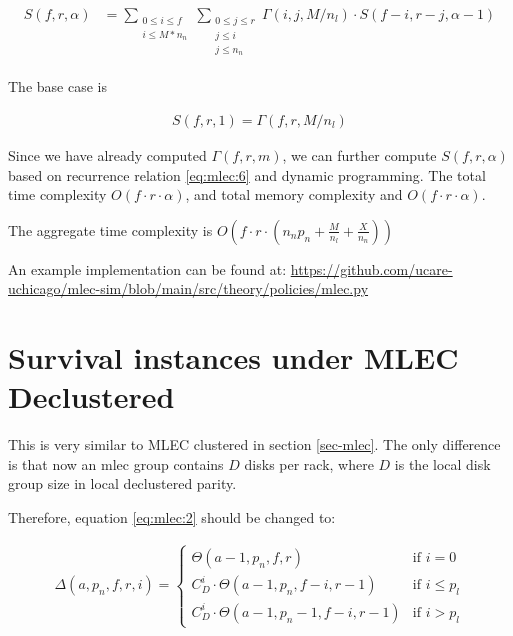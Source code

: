 \documentclass{article}
\begin{document}
\begin{eqnarray}
\begin{aligned}
  S(f,r,\alpha)
  &= \sum_{\substack{0 \leq i \leq f \\ i \leq M*n_n}}
  \sum_{\substack{0 \leq j \leq r \\ j \leq i \\ j \leq n_n}}
  \Gamma(i,j,M/n_l) \cdot S(f-i, r-j, \alpha-1)
\end{aligned}
\label{eq:mlec:6}
\end{eqnarray}

The base case is 

\begin{eqnarray}
  S(f,r,1) =  \Gamma(f,r,M/n_l)
\label{eq:mlec:7}
\end{eqnarray}

Since we have already computed $\Gamma(f,r,m)$, we can further compute $S(f,r,\alpha)$ based on recurrence relation \ref{eq:mlec:6} and dynamic programming. The total time complexity $O(f \cdot r \cdot \alpha)$, and total memory complexity and $O(f \cdot r \cdot \alpha)$.

The aggregate time complexity is $O(f \cdot r \cdot (n_n p_n + \frac{M}{n_l} + \frac{X}{n_n}))$

An example implementation can be found at: \url{https://github.com/ucare-uchicago/mlec-sim/blob/main/src/theory/policies/mlec.py}







\section{Survival instances under MLEC Declustered}

This is very similar to MLEC clustered in section \ref{sec-mlec}. The only difference is that now an mlec group contains $D$ disks per rack, where $D$ is the local disk group size in local declustered parity.

Therefore, equation \ref{eq:mlec:2} should be changed to:

\begin{eqnarray}
  \Delta(a,p_n,f,r, i) =
    \begin{cases}
      \Theta(a-1,p_n,f,r) & \text{if $i = 0$}\\
      C_{D}^{i} \cdot \Theta(a-1,p_n,f-i,r-1) & \text{if $i \leq p_l$} \\ 
      C_{D}^{i} \cdot \Theta(a-1,p_n-1,f-i,r-1) & \text{if $i > p_l$}
    \end{cases}       
\label{eq:mlec_dp:1}
\end{eqnarray}
\end{document}
